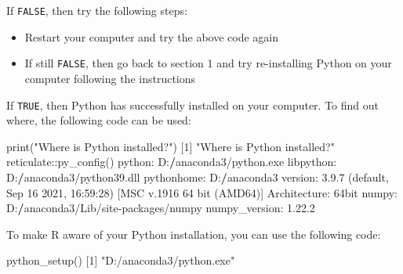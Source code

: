 \documentclass[
]{article}
\newenvironment{Shaded}{\begin{snugshade}}{\end{snugshade}}
\newcommand{\DecValTok}[1]{\textcolor[rgb]{0.00,0.00,0.81}{#1}}
\newcommand{\ErrorTok}[1]{\textcolor[rgb]{0.64,0.00,0.00}{\textbf{#1}}}
\newcommand{\FloatTok}[1]{\textcolor[rgb]{0.00,0.00,0.81}{#1}}
\newcommand{\FunctionTok}[1]{\textcolor[rgb]{0.00,0.00,0.00}{#1}}
\newcommand{\NormalTok}[1]{#1}
\newcommand{\SpecialCharTok}[1]{\textcolor[rgb]{0.00,0.00,0.00}{#1}}
\newcommand{\StringTok}[1]{\textcolor[rgb]{0.31,0.60,0.02}{#1}}
\begin{document}
If \texttt{FALSE}, then try the following steps:

\begin{itemize}
\item
  Restart your computer and try the above code again
\item
  If still \texttt{FALSE}, then go back to section 1 and try
  re-installing Python on your computer following the instructions
\end{itemize}

If \texttt{TRUE}, then Python has successfully installed on your
computer. To find out where, the following code can be used:

\begin{Shaded}
\begin{Highlighting}[]
\FunctionTok{print}\NormalTok{(}\StringTok{"Where is Python installed?"}\NormalTok{)}
\NormalTok{[}\DecValTok{1}\NormalTok{] }\StringTok{"Where is Python installed?"}
\NormalTok{reticulate}\SpecialCharTok{::}\FunctionTok{py\_config}\NormalTok{()}
\NormalTok{python}\SpecialCharTok{:}\NormalTok{         D}\SpecialCharTok{:}\ErrorTok{/}\NormalTok{anaconda3}\SpecialCharTok{/}\NormalTok{python.exe}
\NormalTok{libpython}\SpecialCharTok{:}\NormalTok{      D}\SpecialCharTok{:}\ErrorTok{/}\NormalTok{anaconda3}\SpecialCharTok{/}\NormalTok{python39.dll}
\NormalTok{pythonhome}\SpecialCharTok{:}\NormalTok{     D}\SpecialCharTok{:}\ErrorTok{/}\NormalTok{anaconda3}
\NormalTok{version}\SpecialCharTok{:}        \DecValTok{3}\NormalTok{.}\FloatTok{9.7}\NormalTok{ (default, Sep }\DecValTok{16} \DecValTok{2021}\NormalTok{, }\DecValTok{16}\SpecialCharTok{:}\DecValTok{59}\SpecialCharTok{:}\DecValTok{28}\NormalTok{) [MSC v}\FloatTok{.1916} \DecValTok{64} \FunctionTok{bit}\NormalTok{ (AMD64)]}
\NormalTok{Architecture}\SpecialCharTok{:}\NormalTok{   64bit}
\NormalTok{numpy}\SpecialCharTok{:}\NormalTok{          D}\SpecialCharTok{:}\ErrorTok{/}\NormalTok{anaconda3}\SpecialCharTok{/}\NormalTok{Lib}\SpecialCharTok{/}\NormalTok{site}\SpecialCharTok{{-}}\NormalTok{packages}\SpecialCharTok{/}\NormalTok{numpy}
\NormalTok{numpy\_version}\SpecialCharTok{:}  \DecValTok{1}\NormalTok{.}\FloatTok{22.2}
\end{Highlighting}
\end{Shaded}

To make R aware of your Python installation, you can use the following
code:

\begin{Shaded}
\begin{Highlighting}[]
\FunctionTok{python\_setup}\NormalTok{()}
\NormalTok{[}\DecValTok{1}\NormalTok{] }\StringTok{"D:/anaconda3/python.exe"}
\end{Highlighting}
\end{Shaded}
\end{document}

